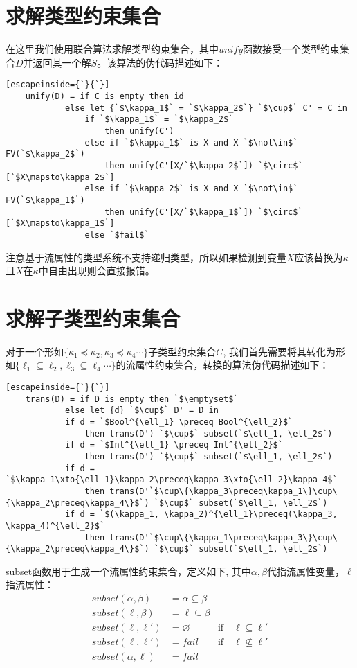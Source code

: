 \documentclass[UTF8, colorlinks]{pkuthss}
\newcommand{\xto}{\xrightarrow}
\let\emptyset\varnothing
\begin{document}
	\section{求解类型约束集合}
	在这里我们使用联合算法求解类型约束集合，其中$unify$函数接受一个类型约束集合$D$并返回其一个解$S$。该算法的伪代码描述如下：
	\begin{lstlisting}[escapeinside={`}{`}]
	unify(D) = if C is empty then id
			else let {`$\kappa_1$` = `$\kappa_2$`} `$\cup$` C' = C in
				if `$\kappa_1$` = `$\kappa_2$` 
					then unify(C')
				else if `$\kappa_1$` is X and X `$\not\in$` FV(`$\kappa_2$`) 
					then unify(C'[X/`$\kappa_2$`]) `$\circ$` [`$X\mapsto\kappa_2$`]
				else if `$\kappa_2$` is X and X `$\not\in$` FV(`$\kappa_1$`)
					then unify(C'[X/`$\kappa_1$`]) `$\circ$` [`$X\mapsto\kappa_1$`]
				else `$fail$`
	\end{lstlisting}
	注意基于流属性的类型系统不支持递归类型，所以如果检测到变量$X$应该替换为$\kappa$且$X$在$\kappa$中自由出现则会直接报错。
	
	\section{求解子类型约束集合}
	对于一个形如$\{\kappa_1\preceq\kappa_2, \kappa_3\preceq\kappa_4\cdots\}$子类型约束集合$C$, 我们首先需要将其转化为形如$\{\ell_1\subseteq\ell_2, \ell_3\subseteq\ell_4\cdots\}$的流属性约束集合，转换的算法伪代码描述如下：
	\begin{lstlisting}[escapeinside={`}{`}]
	trans(D) = if D is empty then `$\emptyset$`
			else let {d} `$\cup$` D' = D in
			if d = `$Bool^{\ell_1} \preceq Bool^{\ell_2}$` 
				then trans(D') `$\cup$` subset(`$\ell_1, \ell_2$`)
			if d = `$Int^{\ell_1} \preceq Int^{\ell_2}$`
				then trans(D') `$\cup$` subset(`$\ell_1, \ell_2$`)
			if d = `$\kappa_1\xto{\ell_1}\kappa_2\preceq\kappa_3\xto{\ell_2}\kappa_4$`
				then trans(D'`$\cup\{\kappa_3\preceq\kappa_1\}\cup\{\kappa_2\preceq\kappa_4\}$`) `$\cup$` subset(`$\ell_1, \ell_2$`)
			if d = `$(\kappa_1, \kappa_2)^{\ell_1}\preceq(\kappa_3, \kappa_4)^{\ell_2}$`
				then trans(D'`$\cup\{\kappa_1\preceq\kappa_3\}\cup\{\kappa_2\preceq\kappa_4\}$`) `$\cup$` subset(`$\ell_1, \ell_2$`)
	\end{lstlisting}
	subset函数用于生成一个流属性约束集合，定义如下, 其中$\alpha, \beta$代指流属性变量，$\ell$指流属性：
	\begin{align*}
		subset(\alpha, \beta) &= \alpha\subseteq\beta\\
		subset(\ell, \beta) &= \ell\subseteq\beta\\
		subset(\ell, \ell') &= \emptyset&\text{if}\quad \ell\subseteq\ell'\\
		subset(\ell, \ell') &= fail&\text{if}\quad \ell\not\subseteq\ell'\\
		subset(\alpha, \ell) &= fail
	\end{align*}
\end{document}
